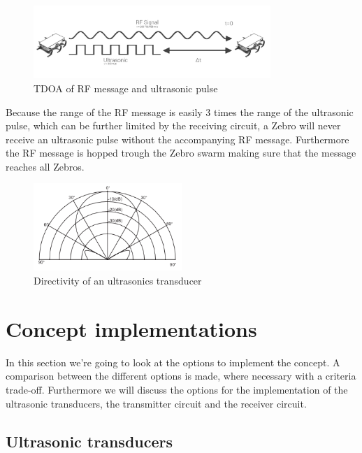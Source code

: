 \begin{figure}[H]
\centering
\includegraphics[width=0.8\textwidth]{Figures/Rf_vs_Us.jpeg}
\caption{TDOA of RF message and ultrasonic pulse}\label{fig:ultra1}
\end{figure}

Because the range of the RF message is easily 3 times the range of the ultrasonic pulse, which can be further limited by the receiving circuit, a Zebro will never receive an ultrasonic pulse without the accompanying RF message. Furthermore the RF message is hopped trough the Zebro swarm making sure that the message reaches all Zebros.

\begin{figure}[H]
\centering
\includegraphics[width=0.5\textwidth]{Figures/ultrasonics_transceivers.PNG}
\caption{Directivity of an ultrasonics transducer}\label{fig:ultra2}
\end{figure}


\section{Concept implementations}
In this section we're going to look at the options to implement the concept. A comparison between the different options is made, where necessary with a criteria trade-off. Furthermore we will discuss the options for the implementation of the ultrasonic transducers, the transmitter circuit and the receiver circuit.

\subsection{Ultrasonic transducers}

